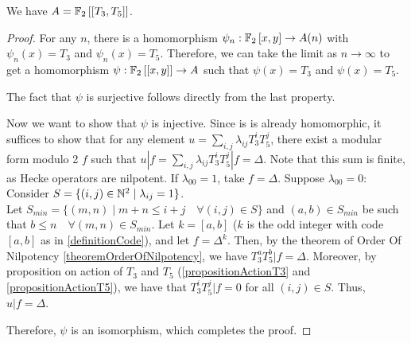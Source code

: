 \begin{property}
	We have $A = \mathbb{F}_2 \left[\left[ T_3, T_5 \right]\right]$.
\end{property}
\begin{proof}
	For any $n$, there is a homomorphism $\psi_n: \mathbb{F}_2 \left[ x, y \right] \to A(n)$ with $\psi_n(x) = T_3$ and $\psi_n(x) = T_5$.
	Therefore, we can take the limit as $n \to \infty$ to get a homomorphism $\psi: \mathbb{F}_2 \left[\left[ x, y \right]\right] \to A$ such that $\psi(x) = T_3$ and $\psi(x) = T_5$.
	
	The fact that $\psi$ is surjective follows directly from the last property.
	
	Now we want to show that $\psi$ is injective.
	Since is is already homomorphic, it suffices to show that for any element $u = \sum_{i,j} \lambda_{ij}T_3^iT_5^j$, there exist a modular form modulo 2 $f$ such that $u|f = \sum_{i,j} \lambda_{ij}T_3^iT_5^j|f = \Delta$.
	Note that this sum is finite, as Hecke operators are nilpotent.
	If $\lambda_{00}=1$, take $f=\Delta$.
	Suppose $\lambda_{00}=0$: Consider $S = \{ (i,j) \in \mathbb{N}^2 \mid \lambda_{ij}=1 \}$.\\
	Let $S_{min} = \{ (m,n) \mid m+n \leq i+j \quad \forall (i,j) \in S \}$ and $(a,b) \in S_{min}$ be such that $b \leq n \quad \forall (m,n) \in S_{min}$.
	Let $k = [a,b]$ ($k$ is the odd integer with code $[a,b]$ as in \ref{definitionCode}), and let $f = \Delta^k$.
	Then, by the theorem of Order Of Nilpotency \ref{theoremOrderOfNilpotency}, we have $T_3^aT_5^b|f=\Delta$.
	Moreover, by proposition on action of $T_3$ and $T_5$ (\ref{propositionActionT3} and \ref{propositionActionT5}), we have that $T_3^iT_5^j|f=0$ for all $(i,j) \in S$.
	Thus, $u|f = \Delta$.
	
	Therefore, $\psi$ is an isomorphism, which completes the proof.
\end{proof}



